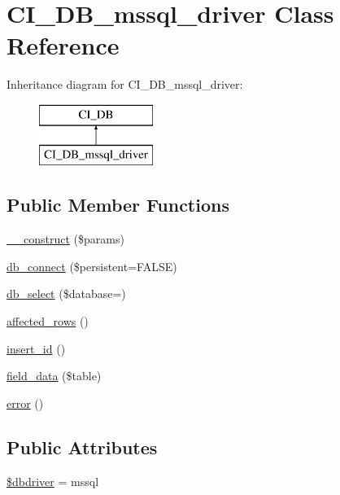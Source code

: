 \hypertarget{class_c_i___d_b__mssql__driver}{}\section{C\+I\+\_\+\+D\+B\+\_\+mssql\+\_\+driver Class Reference}
\label{class_c_i___d_b__mssql__driver}
Inheritance diagram for C\+I\+\_\+\+D\+B\+\_\+mssql\+\_\+driver\+:\begin{figure}[H]
\begin{center}
\leavevmode
\includegraphics[height=2.000000cm]{class_c_i___d_b__mssql__driver}
\end{center}
\end{figure}
\subsection*{Public Member Functions}
\begin{DoxyCompactItemize}
\item 
\mbox{\hyperlink{class_c_i___d_b__mssql__driver_a9162320adff1a1a4afd7f2372f753a3e}{\+\_\+\+\_\+construct}} (\$params)
\item 
\mbox{\hyperlink{class_c_i___d_b__mssql__driver_a52bf595e79e96cc0a7c907a9b45aeb4d}{db\+\_\+connect}} (\$persistent=F\+A\+L\+SE)
\item 
\mbox{\hyperlink{class_c_i___d_b__mssql__driver_a18ae9c21870b30b45337c5e3626190cc}{db\+\_\+select}} (\$database=\textquotesingle{}\textquotesingle{})
\item 
\mbox{\hyperlink{class_c_i___d_b__mssql__driver_a77248aaad33eb132c04cc4aa3f4bc8cb}{affected\+\_\+rows}} ()
\item 
\mbox{\hyperlink{class_c_i___d_b__mssql__driver_a933f2cde8dc7f87875e257d0a4902e99}{insert\+\_\+id}} ()
\item 
\mbox{\hyperlink{class_c_i___d_b__mssql__driver_a90355121e1ed009e0efdbd544ab56efa}{field\+\_\+data}} (\$table)
\item 
\mbox{\hyperlink{class_c_i___d_b__mssql__driver_a43b8d30b879d4f09ceb059b02af2bc02}{error}} ()
\end{DoxyCompactItemize}
\subsection*{Public Attributes}
\begin{DoxyCompactItemize}
\item 
\mbox{\hyperlink{class_c_i___d_b__mssql__driver_a0cde2a16322a023d040aa7f725877597}{\$dbdriver}} = \textquotesingle{}mssql\textquotesingle{}
\end{DoxyCompactItemize}
